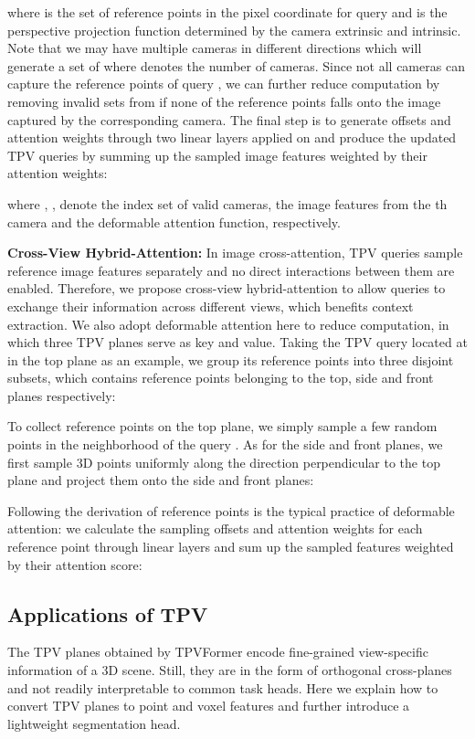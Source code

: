 \documentclass[10pt,twocolumn,letterpaper]{article}
\begin{document}
where  is the set of reference points in the pixel coordinate for query  and  is the perspective projection function determined by the camera extrinsic and intrinsic.
Note that we may have multiple cameras in different directions which will generate a set of  where  denotes the number of cameras.
Since not all cameras can capture the reference points of query , we can further reduce computation by removing invalid sets from  if none of the reference points falls onto the image captured by the corresponding camera.
The final step is to generate offsets and attention weights through two linear layers applied on  and produce the updated TPV queries by summing up the sampled image features weighted by their attention weights:
\begin{small}

\end{small}
where , ,  denote the index set of valid cameras, the image features from the th camera and the deformable attention function, respectively.

\textbf{Cross-View Hybrid-Attention:}
In image cross-attention, TPV queries sample reference image features separately and no direct interactions between them are enabled.
Therefore, we propose cross-view hybrid-attention to allow queries to exchange their information across different views, which benefits context extraction.
We also adopt deformable attention here to reduce computation, in which three TPV planes serve as key and value.
Taking the TPV query  located at  in the top plane as an example, we group its reference points into three disjoint subsets, which contains reference points belonging to the top, side and front planes respectively:

To collect reference points on the top plane, we simply sample a few random points in the neighborhood of the query .
As for the side and front planes, we first sample 3D points uniformly along the direction perpendicular to the top plane and project them onto the side and front planes:

Following the derivation of reference points is the typical practice of deformable attention: we calculate the sampling offsets and attention weights for each reference point through linear layers and sum up the sampled features weighted by their attention score:




\subsection{Applications of TPV}\label{subsec: app}
The TPV planes  obtained by TPVFormer encode fine-grained view-specific information of a 3D scene.
Still, they are in the form of orthogonal cross-planes and not readily interpretable to common task heads.
Here we explain how to convert TPV planes to point and voxel features and further introduce a lightweight segmentation head.
\end{document}
